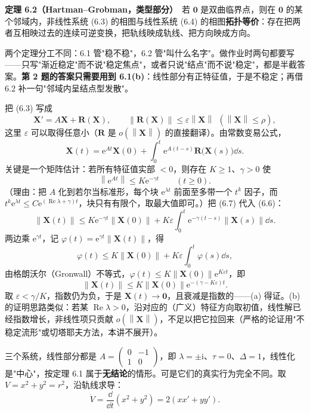 \documentclass[11pt]{ctexart}
\newcommand{\X}{\mathbf{X}}\newcommand{\Y}{\mathbf{Y}}
\newcommand{\eps}{\varepsilon}
\newcommand{\norm}[1]{\left\lVert#1\right\rVert}
\begin{document}
\textbf{定理 6.2（Hartman–Grobman，类型部分）}\ 若 $\mathbf{0}$ 是双曲临界点，则在 $\mathbf{0}$ 的某个邻域内，非线性系统 (6.3) 的相图与线性系统 (6.4) 的相图\textbf{拓扑等价}：存在把两者互相映过去的连续可逆变换，把轨线映成轨线、把方向映成方向。

两个定理分工不同：6.1 管"稳不稳"，6.2 管"叫什么名字"。做作业时两句都要写——只写"渐近稳定"而不说"稳定焦点"，或者只说"结点"而不说"稳定"，都是半截答案。\textbf{第 2 题的答案只需要用到 6.1(b)}：线性部分有正特征值，于是不稳定；再借 6.2 补一句"邻域内呈结点型发散"。


把 (6.3) 写成
\[
\X'=A\X+\mathbf{R}(\X),\qquad \norm{\mathbf{R}(\X)}\le\eps\norm{\X}\ \ (\norm{\X}\le\rho),
\tag{6.5}
\]
这里 $\eps$ 可以取得任意小（$\mathbf{R}$ 是 $o(\norm{\X})$ 的直接翻译）。由常数变易公式，
\[
\X(t)=\mathrm{e}^{At}\X(0)+\int_0^{t}\mathrm{e}^{A(t-s)}\mathbf{R}\big(\X(s)\big)\dd s .
\tag{6.6}
\]
关键是一个矩阵估计：若所有特征值实部 $<0$，则存在 $K\ge1$、$\gamma>0$ 使
\[
\norm{\mathrm{e}^{At}}\le K\mathrm{e}^{-\gamma t}\qquad(t\ge0).
\tag{6.7}
\]
（理由：把 $A$ 化到若尔当标准形，每个块 $\mathrm{e}^{\lambda t}$ 前面至多带一个 $t^{k}$ 因子，而 $t^{k}\mathrm{e}^{\lambda t}\le C\mathrm{e}^{(\operatorname{Re}\lambda+\gamma)t}$，块只有有限个，取最大值即可。）把 (6.7) 代入 (6.6)：
\[
\norm{\X(t)}\le K\mathrm{e}^{-\gamma t}\norm{\X(0)}+K\eps\int_0^{t}\mathrm{e}^{-\gamma(t-s)}\norm{\X(s)}\dd s .
\]
两边乘 $\mathrm{e}^{\gamma t}$，记 $\varphi(t)=\mathrm{e}^{\gamma t}\norm{\X(t)}$，得
\[
\varphi(t)\le K\norm{\X(0)}+K\eps\int_0^{t}\varphi(s)\dd s ,
\]
由格朗沃尔（Gronwall）不等式，$\varphi(t)\le K\norm{\X(0)}\mathrm{e}^{K\eps t}$，即
\[
\norm{\X(t)}\le K\norm{\X(0)}\mathrm{e}^{-({\gamma-K\eps})t}.
\]
取 $\eps<\gamma/K$，指数仍为负，于是 $\X(t)\to\mathbf{0}$，且衰减是指数的——(a) 得证。(b) 的证明思路类似：若某 $\operatorname{Re}\lambda>0$，沿对应的（广义）特征方向取初值，线性解已经指数增长，非线性项只贡献 $o(\norm{\X})$，不足以把它拉回来（严格的论证用"不稳定流形"或切塔耶夫方法，本讲不展开）。


三个系统，线性部分都是 $A=\begin{pmatrix}0&-1\\1&0\end{pmatrix}$，即 $\lambda=\pm\mathrm{i}$、$\tau=0$、$\Delta=1$，线性化是"中心"，按定理 6.1 属于\textbf{无结论}的情形。可是它们的真实行为完全不同。取 $V=x^{2}+y^{2}=r^{2}$，沿轨线求导：
\[
\dot V=\frac{\dd}{\dd t}(x^{2}+y^{2})=2(xx'+yy').
\]
\end{document}
